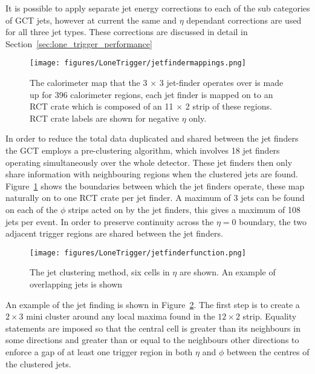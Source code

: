 It is possible to apply separate jet energy corrections to each of the sub 
categories of GCT jets, however at current the same \ET and $\eta$ dependant corrections are used for all three jet types.  These corrections are discussed in detail in 
Section~\ref{sec:lone_trigger_performance}

\begin{figure}[ht]
  \centering    
  \texttt{[image: figures/LoneTrigger/jetfindermappings.png]}
  \caption{The calorimeter map that the 3 $\times$ 3 jet-finder operates over
   is made up for 396 calorimeter regions, each jet finder is mapped on to an 
   RCT crate which is composed of an 11 $\times$ 2 strip of these regions. RCT
   crate labels are shown for negative $\eta$ only. }
  \label{fig:figures_LoneTrigger_jetfindermappings}
\end{figure}

In order to reduce the total data duplicated and shared between the jet finders
the GCT employs a pre-clustering algorithm, which involves 18 jet finders 
operating simultaneously over the whole detector. These jet finders then only
share information with neighbouring regions when the clustered jets are found.
Figure~\ref{fig:figures_LoneTrigger_jetfindermappings} shows the boundaries 
between which the jet finders operate, these map naturally on to one RCT crate 
per jet finder. A maximum of 3 jets can be found on each of the $\phi$ strips
acted on by the jet finders, this gives a maximum of 108 jets per event. In
order to preserve continuity across the $\eta = 0$ boundary, the two adjacent
trigger regions are shared between the jet finders.


\begin{figure}[ht]
  \centering
 \texttt{[image: figures/LoneTrigger/jetfinderfunction.png]}
  \caption{The \Lone jet clustering method, six cells in $\eta$ are shown. An
  example of overlapping jets is shown}
  \label{fig:figures_LoneTrigger_jetfinderfunction}
\end{figure}


An example of the jet finding is shown in
Figure~\ref{fig:figures_LoneTrigger_jetfinderfunction}. The first step is to 
create a $2 \times 3$ mini cluster around any local maxima found in the $12 
\times 2$ strip. Equality statements are imposed so that the central cell is 
greater than its neighbours in some directions and greater than or equal to the 
neighbours other directions to enforce a gap of at least one trigger region in 
both $\eta$ and $\phi$ between the centres of the clustered jets.

